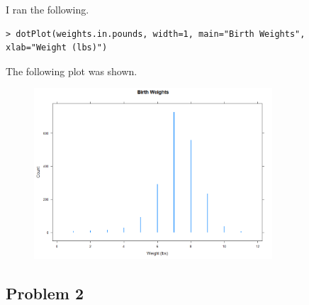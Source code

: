 \documentclass[12pt]{article}
\begin{document}
I ran the following.
\scriptsize
\begin{verbatim}
> dotPlot(weights.in.pounds, width=1, main="Birth Weights", xlab="Weight (lbs)")
\end{verbatim}
\normalsize
The following plot was shown.
\begin{figure}[H]
    \begin{center}
        \includegraphics[width=3.5in]{section3problem1.png}
    \end{center}
\end{figure}

\subsection*{Problem 2}
\end{document}
